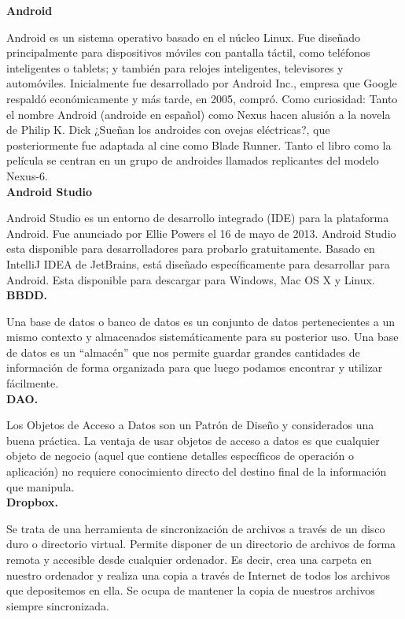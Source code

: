 \documentclass[../pfc.tex]{subfiles}
\begin{document}
	
	\textbf{Android}
	
	Android es un sistema operativo basado en el núcleo Linux. Fue diseñado principalmente para dispositivos móviles con pantalla táctil, como teléfonos inteligentes o tablets; y también para relojes inteligentes, televisores y automóviles. Inicialmente fue desarrollado por Android Inc., empresa que Google respaldó económicamente y más tarde, en 2005, compró. Como curiosidad: Tanto el nombre Android (androide en español) como Nexus hacen alusión a la novela de Philip K. Dick ¿Sueñan los androides con ovejas eléctricas?, que posteriormente fue adaptada al cine como Blade Runner. Tanto el libro como la película se centran en un grupo de androides llamados replicantes del modelo Nexus-6.\\
	
	\textbf{Android Studio}
	
	Android Studio es un entorno de desarrollo integrado (IDE) para la plataforma Android. Fue anunciado por Ellie Powers el 16 de mayo de 2013. Android Studio esta disponible para desarrolladores para probarlo gratuitamente. Basado en IntelliJ IDEA de JetBrains, está diseñado específicamente para desarrollar para Android. Esta disponible para descargar para Windows, Mac OS X y Linux.\\
	
	\textbf{BBDD.}
	
	Una base de datos o banco de datos es un conjunto de datos pertenecientes a un mismo
	contexto y almacenados sistemáticamente para su posterior uso. Una base de datos es un “almacén”
	que nos permite guardar grandes cantidades de información de forma organizada para que luego
	podamos encontrar y utilizar fácilmente.\\
	
	\textbf{DAO.}
	
	Los Objetos de Acceso a Datos son un Patrón de Diseño y considerados una buena práctica.
	La ventaja de usar objetos de acceso a datos es que cualquier objeto de negocio (aquel que contiene
	detalles específicos de operación o aplicación) no requiere conocimiento directo del destino final de
	la información que manipula.\\
	
	\textbf{Dropbox.}
	
	Se trata de una herramienta de sincronización de archivos a través de un disco duro o
	directorio virtual. Permite disponer de un directorio de archivos de forma remota y accesible desde
	cualquier ordenador. Es decir, crea una carpeta en nuestro ordenador y realiza una copia a través
	de Internet de todos los archivos que depositemos en ella. Se ocupa de mantener la copia de
	nuestros archivos siempre sincronizada.\\
	
\end{document}
